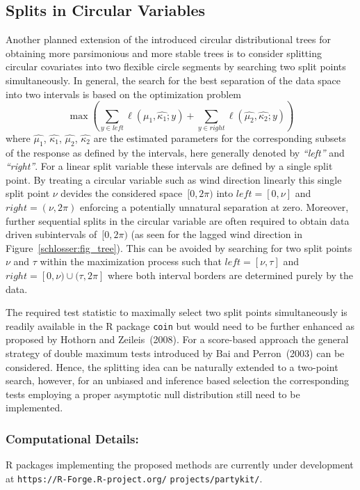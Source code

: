 \documentclass[twoside]{report}
\begin{document}
\subsection{Splits in Circular Variables}
Another planned extension of the introduced circular distributional trees 
for obtaining more parsimonious and more stable trees is to
consider splitting circular covariates into two flexible circle segments by searching two split 
points simultaneously.
In general, the search for the best separation of the data space into two intervals is based on the optimization problem
$$
\max \left(\sum_{y \in \mathit{left}} \ell(\hat{\mu_1}, \hat{\kappa_1}; y) + \sum_{y \in \mathit{right}} \ell(\hat{\mu_2}, \hat{\kappa_2}; y)\right)
$$
where $\hat{\mu_1}$, $\hat{\kappa_1}$, $\hat{\mu_2}$, $\hat{\kappa_2}$ are the estimated parameters for the corresponding subsets of the response as defined by the intervals, here generally denoted by \textit{``left''} and \textit{``right''}.
For a linear split variable these intervals are defined by a single split point.
By treating a circular variable such as wind direction linearly
this single split point $\nu$ devides the considered space~$[0,2\pi)$ into
$\mathit{left}=[0,\nu]$ and $\mathit{right}=(\nu,2\pi)$ enforcing a potentially unnatural 
separation at zero. 
Moreover, further sequential splits in the circular variable are often required to obtain 
data driven subintervals of~$[0,2\pi)$ (as seen for the lagged wind direction in Figure~\ref{schlosser:fig_tree}).
This can be avoided by searching for two split points $\nu$ and $\tau$ within the maximization
process such that $\mathit{left}=[\nu,\tau]$ and $\mathit{right}=[0,\nu) \cup (\tau,2\pi]$
where both interval borders are determined purely by the data.

The required test statistic to maximally select two split points simultaneously is readily 
available in the \textsf{R} package \texttt{coin} but would need to be further enhanced as proposed 
by Hothorn and Zeileis~(2008). For a score-based approach the general strategy of double maximum tests introduced by Bai and Perron~(2003) can be considered. 
Hence, the splitting idea can be naturally extended to a two-point search, however, for 
an unbiased and inference based selection the corresponding tests employing a proper
asymptotic null distribution still need to be implemented.

\bigskip

\subsubsection*{Computational Details:}
\textsf{R} packages implementing the proposed methods are currently under development at
\texttt{https://R-Forge.R-project.org/} \texttt{projects/partykit/}.
\end{document}
